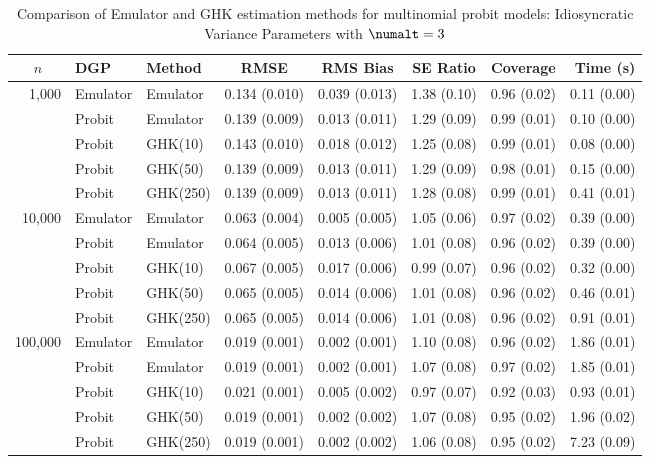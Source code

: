 \begin{table}[htbp]
\centering
\footnotesize
\begin{tabular}{@{}rllrrrrr@{}}
\toprule
\multicolumn{1}{c}{$n$} & \multicolumn{1}{l}{DGP} & \multicolumn{1}{l}{Method} & \multicolumn{1}{c}{RMSE} & \multicolumn{1}{c}{RMS Bias} & \multicolumn{1}{c}{SE Ratio} & \multicolumn{1}{c}{Coverage} & \multicolumn{1}{r}{Time (s)} \\
\midrule
\multirow{5}{*}{1,000} & Emulator & Emulator & 0.134 (0.010) & 0.039 (0.013) & 1.38 (0.10) & 0.96 (0.02) & 0.11 (0.00) \\
 & Probit & Emulator & 0.139 (0.009) & 0.013 (0.011) & 1.29 (0.09) & 0.99 (0.01) & 0.10 (0.00) \\
 & Probit & GHK(10) & 0.143 (0.010) & 0.018 (0.012) & 1.25 (0.08) & 0.99 (0.01) & 0.08 (0.00) \\
 & Probit & GHK(50) & 0.139 (0.009) & 0.013 (0.011) & 1.29 (0.09) & 0.98 (0.01) & 0.15 (0.00) \\
 & Probit & GHK(250) & 0.139 (0.009) & 0.013 (0.011) & 1.28 (0.08) & 0.99 (0.01) & 0.41 (0.01) \\
\midrule
\multirow{5}{*}{10,000} & Emulator & Emulator & 0.063 (0.004) & 0.005 (0.005) & 1.05 (0.06) & 0.97 (0.02) & 0.39 (0.00) \\
 & Probit & Emulator & 0.064 (0.005) & 0.013 (0.006) & 1.01 (0.08) & 0.96 (0.02) & 0.39 (0.00) \\
 & Probit & GHK(10) & 0.067 (0.005) & 0.017 (0.006) & 0.99 (0.07) & 0.96 (0.02) & 0.32 (0.00) \\
 & Probit & GHK(50) & 0.065 (0.005) & 0.014 (0.006) & 1.01 (0.08) & 0.96 (0.02) & 0.46 (0.01) \\
 & Probit & GHK(250) & 0.065 (0.005) & 0.014 (0.006) & 1.01 (0.08) & 0.96 (0.02) & 0.91 (0.01) \\
\midrule
\multirow{5}{*}{100,000} & Emulator & Emulator & 0.019 (0.001) & 0.002 (0.001) & 1.10 (0.08) & 0.96 (0.02) & 1.86 (0.01) \\
 & Probit & Emulator & 0.019 (0.001) & 0.002 (0.001) & 1.07 (0.08) & 0.97 (0.02) & 1.85 (0.01) \\
 & Probit & GHK(10) & 0.021 (0.001) & 0.005 (0.002) & 0.97 (0.07) & 0.92 (0.03) & 0.93 (0.01) \\
 & Probit & GHK(50) & 0.019 (0.001) & 0.002 (0.002) & 1.07 (0.08) & 0.95 (0.02) & 1.96 (0.02) \\
 & Probit & GHK(250) & 0.019 (0.001) & 0.002 (0.002) & 1.06 (0.08) & 0.95 (0.02) & 7.23 (0.09) \\
\bottomrule
\end{tabular}
\caption{Comparison of Emulator and GHK estimation methods for multinomial probit models: Idiosyncratic Variance Parameters with $\numalt=3$}
\label{tab:emulator_vs_ghk:3:psi}
\end{table}
